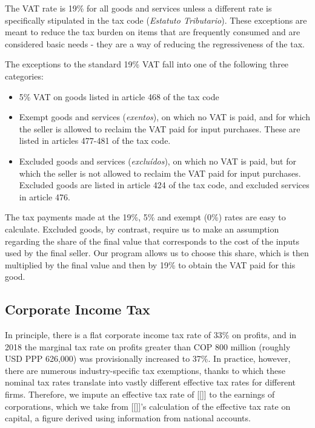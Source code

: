 \documentclass[12pt]{article}
\begin{document}
\begin{appendices}
The VAT rate is 19\% for all goods and services
unless a different rate is specifically stipulated in the tax code
(\textit{Estatuto Tributario}).
These exceptions are meant to reduce the tax burden
on items that are frequently consumed and are considered basic needs
- they are a way of reducing the regressiveness of the tax.

The exceptions to the standard 19\% VAT fall into one of the following three categories:
\begin{itemize}
\item 5\% VAT on goods listed in article 468 of the tax code
\item Exempt goods and services (\textit{exentos}),
  on which no VAT is paid,
  and for which the seller is allowed to reclaim
  the VAT paid for input purchases.
  These are listed in articles 477-481 of the tax code.
\item Excluded goods and services (\textit{exclu\'{i}dos}),
  on which no VAT is paid,
  but for which the seller is not allowed to reclaim
  the VAT paid for input purchases.
  Excluded goods are listed in article 424 of the tax code,
  and excluded services in article 476.
\end{itemize}

The tax payments made at the 19\%, 5\% and exempt (0\%) rates
are easy to calculate.
Excluded goods, by contrast, require us to make an assumption regarding
the share of the final value that corresponds to
the cost of the inputs used by the final seller.
Our program allows us to choose this share,
which is then multiplied by the final value and then by 19\%
to obtain the VAT paid for this good.

\subsection{Corporate Income Tax}

In principle, there is a flat corporate income tax rate of 33\% on profits,
and in 2018 the marginal tax rate
on profits greater than COP 800 million (roughly USD PPP 626,000)
was provisionally increased to 37\%.
In practice, however, there are numerous industry-specific tax exemptions,
thanks to which these nominal tax rates translate into
vastly different effective tax rates for different firms.
Therefore, we impute an effective tax rate of [[]]
to the earnings of corporations,
which we take from [[]]'s calculation of the effective tax rate on capital,
a figure derived using information from national accounts.


\end{appendices}
\end{document}
